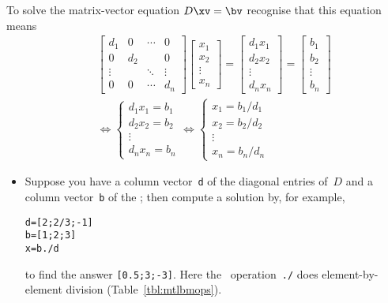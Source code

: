 \begin{compute}
To solve the matrix-vector equation \(D\xv=\bv\) recognise that this equation means
\begin{eqnarray}&&
\begin{bmatrix} d_1&0&\cdots&0
\\0&d_2&&0
\\\vdots&&\ddots&\vdots
\\0&0&\cdots&d_n \end{bmatrix}
\begin{bmatrix} x_1\\x_2\\\vdots\\x_n \end{bmatrix}
=\begin{bmatrix} d_1x_1\\d_2x_2\\\vdots\\d_nx_n \end{bmatrix}
=\begin{bmatrix} b_1\\b_2\\\vdots\\b_n \end{bmatrix}
\nonumber\\&&\iff
\begin{cases} d_1x_1=b_1\\d_2x_2=b_2\\\vdots\\d_nx_n=b_n \end{cases}
\iff
\begin{cases} x_1=b_1/d_1\\x_2=b_2/d_2\\\vdots\\x_n=b_n/d_n \end{cases}
\label{eq:ddslin}
\end{eqnarray}
\begin{itemize}
\item Suppose you have a column vector~\verb|d| of the diagonal entries of~\(D\) and a column vector~\verb|b| of the \rhs; then compute a solution by, for example,
\setbox\ajrqrbox\hbox{}%
\marginpar{\usebox{\ajrqrbox\\[2ex]}}%
\begin{verbatim}
d=[2;2/3;-1]
b=[1;2;3]
x=b./d
\end{verbatim}
to find the answer \verb|[0.5;3;-3]|.
Here the \script\ operation~\verb|./| does  element-by-element division (Table~\ref{tbl:mtlbmops}).


\end{itemize}
\end{compute}
